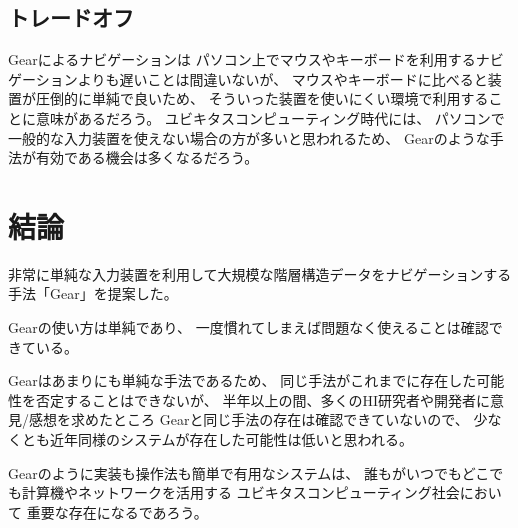 \documentclass[twoside]{wiss}
\def\GEAR{\textsf{Gear}}
\begin{document}
% 

\subsection{トレードオフ}

{\GEAR}によるナビゲーションは
パソコン上でマウスやキーボードを利用するナビゲーションよりも遅いことは間違いないが、
マウスやキーボードに比べると装置が圧倒的に単純で良いため、
そういった装置を使いにくい環境で利用することに意味があるだろう。
ユビキタスコンピューティング時代には、
パソコンで一般的な入力装置を使えない場合の方が多いと思われるため、
{\GEAR}のような手法が有効である機会は多くなるだろう。



\section{結論}

非常に単純な入力装置を利用して大規模な階層構造データをナビゲーションする
手法「{\GEAR}」を提案した。

{\GEAR}の使い方は単純であり、
一度慣れてしまえば問題なく使えることは確認できている。

{\GEAR}はあまりにも単純な手法であるため、
同じ手法がこれまでに存在した可能性を否定することはできないが、
半年以上の間、多くのHI研究者や開発者に意見/感想を求めたところ
{\GEAR}と同じ手法の存在は確認できていないので、
少なくとも近年同様のシステムが存在した可能性は低いと思われる。

{\GEAR}のように実装も操作法も簡単で有用なシステムは、
誰もがいつでもどこでも計算機やネットワークを活用する
ユビキタスコンピューティング社会において
重要な存在になるであろう。

{\scriptsize


}
\end{document}
